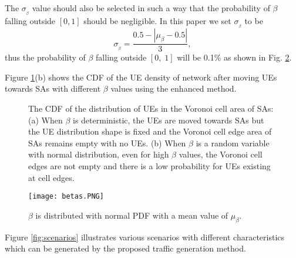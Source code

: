 \documentclass[journal]{IEEEtran}
\begin{document}
The $\sigma_{_{\beta}}$ value should also be selected in such a way that the probability of $\beta$ falling outside $\left [0, 1 \right]$ should be negligible. In this paper we set $\sigma_{_{\beta}}$ to be
\begin{equation}
\sigma_{_{\beta}}=\frac{0.5-\left | \mu_{\beta} - 0.5 \right |}{3},
\end{equation}
thus the probability of $\beta$ falling outside $\left [0, \; 1 \right]$ will be 0.1\% as shown in Fig. \ref{fig:betas}.

Figure \ref{fig:cdfs}(b) shows the CDF of the UE density of network after moving UEs towards SAs with different $\beta$ values using the enhanced method.

\begin{figure}
   \centering
   \hfill
   \caption{The CDF of the distribution of UEs in the Voronoi cell area of SAs: (a) When $\beta$ is deterministic, the UEs are moved towards SAs but the UE distribution shape is fixed and the Voronoi cell edge area of SAs remains empty with no UEs. (b) When $\beta$ is a random variable with normal distribution, even for high $\beta$ values, the Voronoi cell edges are not empty and there is a low probability for UEs existing at cell edges.}
   \label{fig:cdfs}
\end{figure}


\begin{figure}
\centering
\texttt{[image: betas.PNG]}
\caption{$\beta$ is distributed with normal PDF with a mean value of $\mu_{\beta}$.}
\label{fig:betas}
\end{figure}

Figure \ref{fig:scenarios} illustrates various scenarios with different characteristics which can be generated by the proposed traffic generation method.
\end{document}
